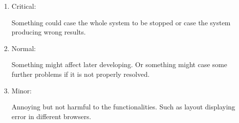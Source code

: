 \documentclass[twoside,a4paper]{refart}
\begin{document}
\begin{enumerate}
\item Critical:

Something could case the whole system to be stopped or case the system producing wrong results.

\item Normal:

Something might affect later developing. Or something might case some further problems if it is not properly resolved.

\item Minor:

Annoying but not harmful to the functionalities. Such as layout displaying error in different browsers.
\end{enumerate}

\printindex
\end{document}
